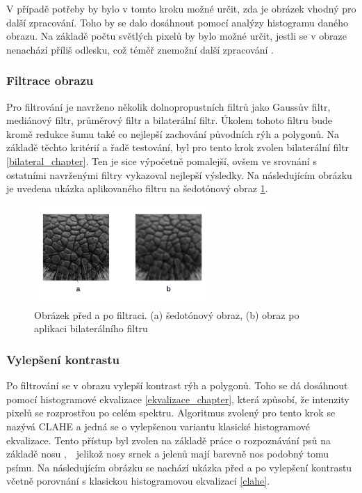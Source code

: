 V případě potřeby by bylo v tomto kroku možné určit, zda je obrázek vhodný pro další zpracování. Toho by se dalo dosáhnout pomocí analýzy histogramu daného obrazu. Na základě počtu světlých pixelů by bylo možné určit, jestli se v obraze nenachází příliš odlesku, což téměř znemožní další zpracování \cite{psi}.

\subsubsection{Filtrace obrazu}

Pro filtrování je navrženo několik dolnopropustních filtrů jako Gaussův filtr, mediánový filtr, průměrový filtr a bilaterální filtr. Úkolem tohoto filtru bude kromě redukce šumu také co nejlepší zachování původních rýh a polygonů. Na základě těchto kritérií a řadě testování, byl pro tento krok zvolen bilaterální filtr \ref{bilateral_chapter}. Ten je sice výpočetně pomalejší, ovšem ve srovnání s ostatními navrženými filtry vykazoval nejlepší výsledky. Na následujícím obrázku je uvedena ukázka aplikovaného filtru na šedotónový obraz \ref{filtr}.

\newpage
\begin{figure}[h]
	\centering
	\includegraphics[width=0.6\textwidth]{obrazky/filtr.png}
	\caption{Obrázek před a po filtraci. (a) šedotónový obraz, (b) obraz po aplikaci bilaterálního filtru}
	\label{filtr}
\end{figure} 

\subsubsection{Vylepšení kontrastu}

Po filtrování se v obrazu vylepší kontrast rýh a polygonů. Toho se dá dosáhnout pomocí histogramové ekvalizace \ref{ekvalizace_chapter}, která způsobí, že intenzity pixelů se rozprostřou po celém spektru. Algoritmus zvolený pro tento krok se nazývá CLAHE a jedná se o vylepšenou variantu klasické histogramové ekvalizace. Tento přístup byl zvolen na základě práce o rozpoznávání psů na základě nosu \cite{psi},~~jelikož nosy srnek a jelenů mají barevně nos podobný tomu psímu. Na následujícím obrázku se nachází ukázka před a po vylepšení kontrastu včetně porovnání s klasickou histogramovou ekvalizací \ref{clahe}.


